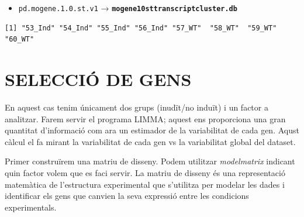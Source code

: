 \documentclass[
]{article}
\newenvironment{Shaded}{\begin{snugshade}}{\end{snugshade}}
\newcommand{\CommentTok}[1]{\textcolor[rgb]{0.56,0.35,0.01}{\textit{#1}}}
\newcommand{\FunctionTok}[1]{\textcolor[rgb]{0.13,0.29,0.53}{\textbf{#1}}}
\newcommand{\NormalTok}[1]{#1}
\newcommand{\OtherTok}[1]{\textcolor[rgb]{0.56,0.35,0.01}{#1}}
\newcommand{\SpecialCharTok}[1]{\textcolor[rgb]{0.81,0.36,0.00}{\textbf{#1}}}
\providecommand{\tightlist}{%
  \setlength{\itemsep}{0pt}\setlength{\parskip}{0pt}}
\begin{document}
\begin{itemize}
\tightlist
\item
  \texttt{pd.mogene.1.0.st.v1} →
  \textbf{\texttt{mogene10sttranscriptcluster.db}}
\end{itemize}

\begin{Shaded}
\end{Shaded}

\begin{verbatim}
[1] "53_Ind" "54_Ind" "55_Ind" "56_Ind" "57_WT"  "58_WT"  "59_WT"  "60_WT" 
\end{verbatim}

\begin{Shaded}
\end{Shaded}

\section{SELECCIÓ DE GENS}\label{selecciuxf3-de-gens}

En aquest cas tenim únicament dos grups (inudït/no induït) i un factor a
analitzar. Farem servir el programa LIMMA; aquest ens proporciona una
gran quantitat d'informació com ara un estimador de la variabilitat de
cada gen. Aqust càlcul el fa mirant la variabilitat de cada gen vs la
variabilitat global del dataset.

Primer construïrem una matriu de disseny. Podem utilitzar
\emph{modelmatrix} indicant quin factor volem que es faci servir. La
matriu de disseny és una representació matemàtica de l'estructura
experimental que s'utilitza per modelar les dades i identificar els gens
que canvien la seva expressió entre les condicions experimentals.
\end{document}
